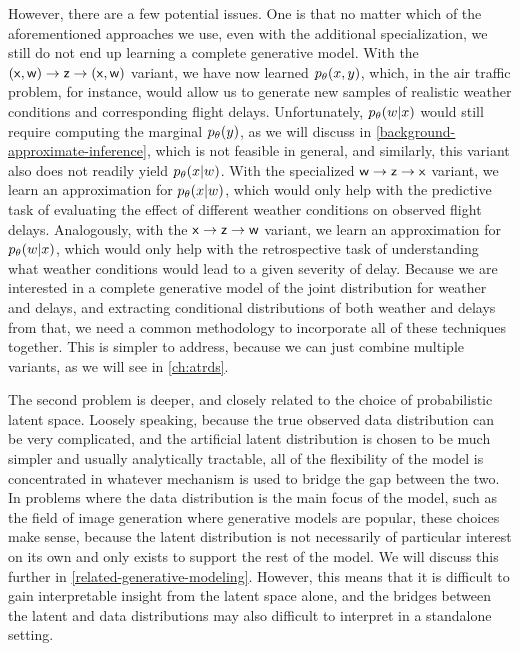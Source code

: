 However, there are a few potential issues. One is that no matter which of the aforementioned approaches we use, even with the additional specialization, we still do not end up learning a complete generative model. With the $(\mathsf x,\mathsf w)\to \mathsf z\to (\mathsf x,\mathsf w)$ variant, we have now learned $\pld{x,y}$, which, in the air traffic problem, for instance, would allow us to generate new samples of realistic weather conditions and corresponding flight delays. Unfortunately, $\pld{w\given x}$ would still require computing the marginal $\pld{y}$, as we will discuss in \cref{background-approximate-inference}, which is not feasible in general, and similarly, this variant also does not readily yield $\pld{x\given w}$. With the specialized $\mathsf w \to \mathsf z\to \mathsf x$ variant, we learn an approximation for $\pld{x\given w}$, which would only help with the predictive task of evaluating the effect of different weather conditions on observed flight delays. Analogously, with the $\mathsf x\to \mathsf z\to \mathsf w$ variant, we learn an approximation for $\pld{w\given x}$, which would only help with the retrospective task of understanding what weather conditions would lead to a given severity of delay. Because we are interested in a complete generative model of the joint distribution for weather and delays, and extracting conditional distributions of both weather and delays from that, we need a common methodology to incorporate all of these techniques together. This is simpler to address, because we can just combine multiple variants, as we will see in \cref{ch:atrds}.

The second problem is deeper, and closely related to the choice of probabilistic latent space. Loosely speaking, because the true observed data distribution can be very complicated, and the artificial latent distribution is chosen to be much simpler and usually analytically tractable, all of the flexibility of the model is concentrated in whatever mechanism is used to bridge the gap between the two. In problems where the data distribution is the main focus of the model, such as the field of image generation where generative models are popular, these choices make sense, because the latent distribution is not necessarily of particular interest on its own and only exists to support the rest of the model. We will discuss this further in \cref{related-generative-modeling}. However, this means that it is difficult to gain interpretable insight from the latent space alone, and the bridges between the latent and data distributions may also difficult to interpret in a standalone setting.

